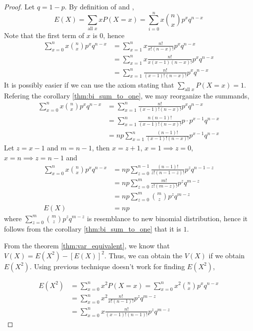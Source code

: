 \begin{proof}
    Let $q = 1 - p$. By definition of  and ,
    \[
    E(X) = \sum_{\text{all } x} x P(X=x) = \sum_{i = 0}^n x{\binom{n}{x} p^x q^{n - x}}
    \]
    Note that the first term of $x$ is 0, hence
    \begin{align*}
        \sum_{x = 0}^n x{\binom{n}{x} p^x q^{n - x}}
        &=  \sum_{x = 1}^n x{\frac{n!}{x!(n-x)!}  p^x q^{n - x}} \\
        &=  \sum_{x = 1}^n x{\frac{n!}{x(x-1)(n-x)!}  p^x q^{n - x}} \\
        &= \sum_{x = 1}^n {\frac{n!}{(x-1)!(n-x)!}  p^x q^{n - x}}
    \end{align*}
    It is possibly easier if we can use the axiom stating that $\sum_{\text{all } x} P(X = x) = 1$. Refering the corollary \ref{thm:bi_sum_to_one}, we may reorganize the summands,
    \begin{align*}
        \sum_{x = 0}^n x{\binom{n}{x} p^x q^{n - x}}
        &= \sum_{x = 1}^n {\frac{n!}{(x-1)!(n-x)!}  p^x q^{n - x}} \\
        &= \sum_{x = 1}^n {\frac{n(n-1)!}{(x-1)!(n-x)!}  p\cdot p^{x-1} q^{n - x}} \\
        &= np \sum_{x = 1}^n {\frac{(n-1)!}{(x-1)!(n-x)!}  p^{x-1} q^{n - x}}
    \end{align*}
    Let $z = x-1$ and $m = n - 1$, then $x = z+1$, $x = 1 \implies z = 0$,  $x = n \implies z = n-1$ and
    \begin{align*}
        \sum_{x = 0}^n x{\binom{n}{x} p^x q^{n - x}}
        &= np \sum_{z = 0}^{n-1} {\frac{(n-1)!}{z!(n-1-z)!}  p^z q^{n - 1 - z }} \\
        &= np \sum_{z = 0}^{m} {\frac{m!}{z!(m-z)!}  p^z q^{m - z }} \\
        &= np \sum_{z = 0}^{m} \binom{m}{z} p^zq^{m-z} \\
        E(X) &= np
    \end{align*}
where $\sum_{z = 0}^{m} \binom{m}{z} p^zq^{m-z}$ is resemblance to new binomial distribution, hence it follows from the corollary \ref{thm:bi_sum_to_one} that it is $1$.

From the theorem \ref{thm:var_equivalent}, we know that $V(X) = E(X^2) - {[E(X)]}^2$. Thus, we can obtain the $V(X)$ if we obtain $E(X^2)$. Using previous technique doesn't work for finding $E(X^2)$,

\begin{align*}
    E(X^2) &= \sum^{n}_{x = 0} x^2P(X=x)
        = \sum_{x = 0}^n x^2{\binom{n}{x} p^x q^{n - x}} \\
        &= \sum_{x = 0}^{n} {x^2 \frac{n!}{x!(n-1)!}  p^z q^{m - z }} \\
        &= \sum_{x = 0}^{n} {x \frac{n!}{(x-1)!(n-1)!}  p^z q^{m - z }}
\end{align*}



\end{proof}
